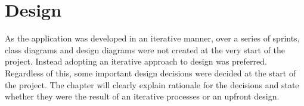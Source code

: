 \chapter{Design}







As the application was developed in an iterative manner, over a series of sprints, class diagrams and design diagrams were not created at the very start of the project. Instead adopting an iterative approach to design was preferred. Regardless of this, some important design decisions were decided at the start of the project. The chapter will clearly explain rationale for the decisions and state whether they were the result of an iterative processes or an upfront design.

